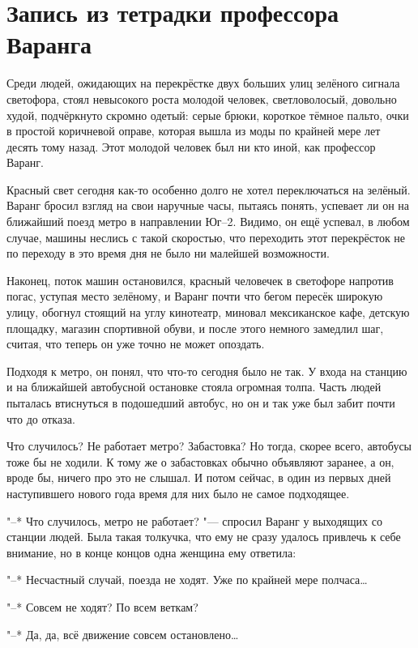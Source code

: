 \section{Запись из тетрадки профессора Варанга}

Среди людей, ожидающих на перекрёстке двух больших улиц зелёного сигнала
светофора, стоял невысокого роста молодой человек, светловолосый, довольно худой,
подчёркнуто скромно одетый: серые брюки, короткое тёмное пальто, очки в простой
коричневой оправе, которая вышла из моды по крайней мере лет десять тому назад.
Этот молодой человек был ни кто иной, как профессор Варанг.

Красный свет сегодня как-то особенно долго не хотел переключаться на зелёный.
Варанг бросил взгляд на свои наручные часы, пытаясь понять, успевает ли он на
ближайший поезд метро в направлении Юг--2.
Видимо, он ещё успевал, в любом случае, машины неслись с такой скоростью, что
переходить этот перекрёсток не по переходу в это время дня не было ни малейшей
возможности.

Наконец, поток машин остановился, красный человечек в светофоре напротив погас,
уступая место зелёному, и Варанг почти что бегом пересёк широкую улицу, обогнул
стоящий на углу кинотеатр, миновал мексиканское кафе, детскую площадку, магазин
спортивной обуви, и после этого немного замедлил шаг, считая, что теперь он уже
точно не может опоздать.

Подходя к метро, он понял, что что-то сегодня было не так.
У входа на станцию и на ближайшей автобусной остановке стояла огромная толпа.
Часть людей пыталась втиснуться в подошедший автобус, но он и так уже был забит
почти что до отказа.

Что случилось?
Не работает метро?
Забастовка?
Но тогда, скорее всего, автобусы тоже бы не ходили.
К тому же о забастовках обычно объявляют заранее, а он, вроде бы, ничего про это
не слышал.
И потом сейчас, в один из первых дней наступившего нового года время для них
было не самое подходящее.

"--* Что случилось, метро не работает? "--- спросил Варанг у выходящих со
станции людей.
Была такая толкучка, что ему не сразу удалось привлечь к себе внимание, но в
конце концов одна женщина ему ответила:

"--* Несчастный случай, поезда не ходят.
Уже по крайней мере полчаса\ldots

"--* Совсем не ходят?
По всем веткам?

"--* Да, да, всё движение совсем остановлено\ldots

